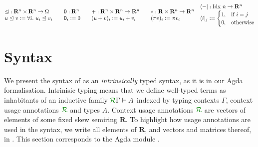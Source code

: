 \documentclass[submission,copyright,creativecommons]{eptcs}
\begin{document}
\begin{definition}
  ~\\
$    \begin{matrix*}[l]
      {\subres} : \mathbf{R}^n \times \mathbf{R}^n \to \Omega \\
      u \subres v := \forall i.~u_i \subres v_i
    \end{matrix*}
    \qquad
    \begin{matrix*}[l]
      \vct 0 : \mathbf{R}^n \\
      \vct 0_i := 0
    \end{matrix*}
    \qquad
    \begin{matrix*}[l]
      + : \mathbf{R}^n \times \mathbf{R}^n \to \mathbf{R}^n \\
      (u + v)_i := u_i + v_i
    \end{matrix*}
    \qquad
    \begin{matrix*}[l]
      * : \mathbf R \times \mathbf{R}^n \to \mathbf{R}^n \\
      (\pi v)_i := \pi v_i
    \end{matrix*}
    \quad
    \begin{matrix*}[l]
      \langle {-} \rvert : \mathrm{Idx}~n \to \mathbf{R}^n \\
      \langle i \rvert_j :=
      \begin{cases}
        1, & \textrm{if }i = j \\
        0, & \textrm{otherwise} \\
      \end{cases}
    \end{matrix*}$
\end{definition}

\section{Syntax}\label{sec:syntax}

We present the syntax of \name{} as an \emph{intrinsically} typed
syntax, as it is in our Agda formalisation. Intrinisic typing means
that we define well-typed terms as inhabitants of an inductive family
$\ctx\Gamma{R} \vdash A$ indexed by typing contexts $\Gamma$, context
usage annotations $\resctx{R}$ and types $A$. Context usage
annotations $\resctx{R}$ are vectors of elements of some fixed skew
semiring $\mathbf R$. To highlight how usage annotations are used in
the syntax, we write all elements of $\mathbf R$, and vectors and
matrices thereof, in . This section corresponds to
the Agda module .
\end{document}
